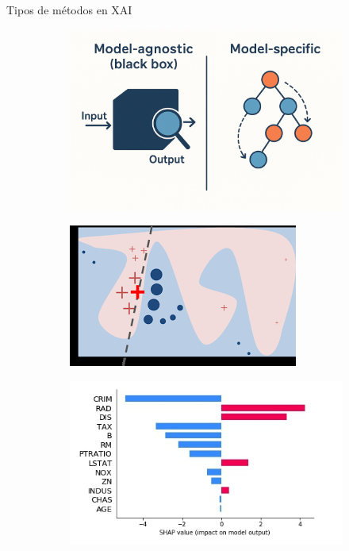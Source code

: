 \begin{frame}{Tipos de métodos en XAI}

	\begin{figure}[htbp]
		\centering
		\begin{subfigure}[b]{0.40\textwidth}
			\includegraphics[width=\textwidth]{pic/img/XAI/modelSpecificvsAgnostic.png}
		\end{subfigure}
		 \pause
		\hfill
		\begin{subfigure}[b]{0.40\textwidth}
			\includegraphics[width=\textwidth]{pic/img/XAI/localVsGlobalPrediction.png}
		\end{subfigure}
		\pause
		\hfill
		\begin{subfigure}[b]{0.40\textwidth}
			\includegraphics[width=\textwidth]{pic/img/XAI/featureRelevanceExample.jpg}
		\end{subfigure}
	\end{figure}
	

\end{frame}

